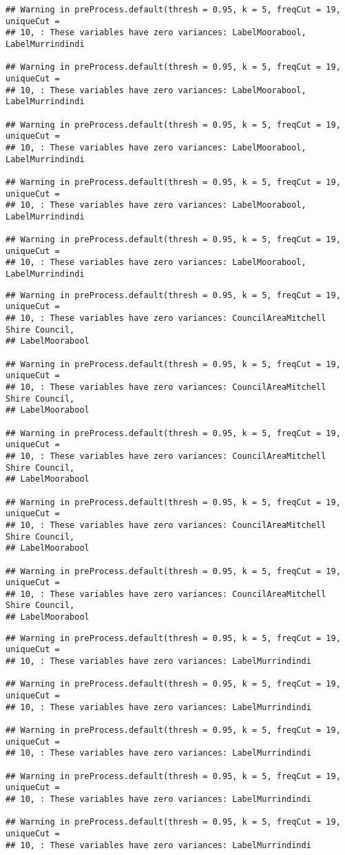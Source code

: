 \documentclass[
]{article}
\begin{document}
\begin{verbatim}
## Warning in preProcess.default(thresh = 0.95, k = 5, freqCut = 19, uniqueCut =
## 10, : These variables have zero variances: LabelMoorabool, LabelMurrindindi

## Warning in preProcess.default(thresh = 0.95, k = 5, freqCut = 19, uniqueCut =
## 10, : These variables have zero variances: LabelMoorabool, LabelMurrindindi

## Warning in preProcess.default(thresh = 0.95, k = 5, freqCut = 19, uniqueCut =
## 10, : These variables have zero variances: LabelMoorabool, LabelMurrindindi

## Warning in preProcess.default(thresh = 0.95, k = 5, freqCut = 19, uniqueCut =
## 10, : These variables have zero variances: LabelMoorabool, LabelMurrindindi

## Warning in preProcess.default(thresh = 0.95, k = 5, freqCut = 19, uniqueCut =
## 10, : These variables have zero variances: LabelMoorabool, LabelMurrindindi
\end{verbatim}

\begin{verbatim}
## Warning in preProcess.default(thresh = 0.95, k = 5, freqCut = 19, uniqueCut =
## 10, : These variables have zero variances: CouncilAreaMitchell Shire Council,
## LabelMoorabool

## Warning in preProcess.default(thresh = 0.95, k = 5, freqCut = 19, uniqueCut =
## 10, : These variables have zero variances: CouncilAreaMitchell Shire Council,
## LabelMoorabool

## Warning in preProcess.default(thresh = 0.95, k = 5, freqCut = 19, uniqueCut =
## 10, : These variables have zero variances: CouncilAreaMitchell Shire Council,
## LabelMoorabool

## Warning in preProcess.default(thresh = 0.95, k = 5, freqCut = 19, uniqueCut =
## 10, : These variables have zero variances: CouncilAreaMitchell Shire Council,
## LabelMoorabool

## Warning in preProcess.default(thresh = 0.95, k = 5, freqCut = 19, uniqueCut =
## 10, : These variables have zero variances: CouncilAreaMitchell Shire Council,
## LabelMoorabool
\end{verbatim}

\begin{verbatim}
## Warning in preProcess.default(thresh = 0.95, k = 5, freqCut = 19, uniqueCut =
## 10, : These variables have zero variances: LabelMurrindindi

## Warning in preProcess.default(thresh = 0.95, k = 5, freqCut = 19, uniqueCut =
## 10, : These variables have zero variances: LabelMurrindindi

## Warning in preProcess.default(thresh = 0.95, k = 5, freqCut = 19, uniqueCut =
## 10, : These variables have zero variances: LabelMurrindindi

## Warning in preProcess.default(thresh = 0.95, k = 5, freqCut = 19, uniqueCut =
## 10, : These variables have zero variances: LabelMurrindindi

## Warning in preProcess.default(thresh = 0.95, k = 5, freqCut = 19, uniqueCut =
## 10, : These variables have zero variances: LabelMurrindindi
\end{verbatim}
\end{document}
